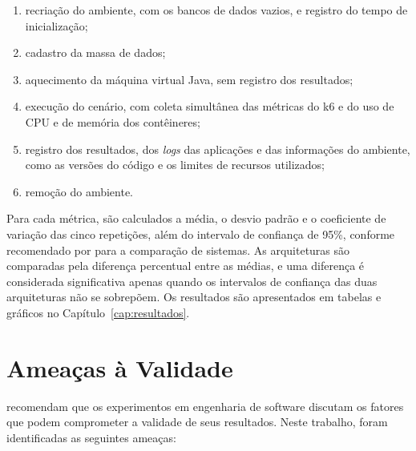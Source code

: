 \begin{enumerate}
    \item recriação do ambiente, com os bancos de dados vazios, e registro do tempo de
    inicialização;
    \item cadastro da massa de dados;
    \item aquecimento da máquina virtual Java, sem registro dos resultados;
    \item execução do cenário, com coleta simultânea das métricas do k6 e do uso de CPU e de
    memória dos contêineres;
    \item registro dos resultados, dos \textit{logs} das aplicações e das informações do
    ambiente, como as versões do código e os limites de recursos utilizados;
    \item remoção do ambiente.
\end{enumerate}

Para cada métrica, são calculados a média, o desvio padrão e o coeficiente de variação das
cinco repetições, além do intervalo de confiança de 95\%, conforme recomendado por
 para a comparação de sistemas. As arquiteturas são comparadas pela
diferença percentual entre as médias, e uma diferença é considerada significativa apenas
quando os intervalos de confiança das duas arquiteturas não se sobrepõem. Os resultados são
apresentados em tabelas e gráficos no Capítulo~\ref{cap:resultados}.

\section{Ameaças à Validade}

 recomendam que os experimentos em engenharia de software discutam os
fatores que podem comprometer a validade de seus resultados. Neste trabalho, foram
identificadas as seguintes ameaças:

